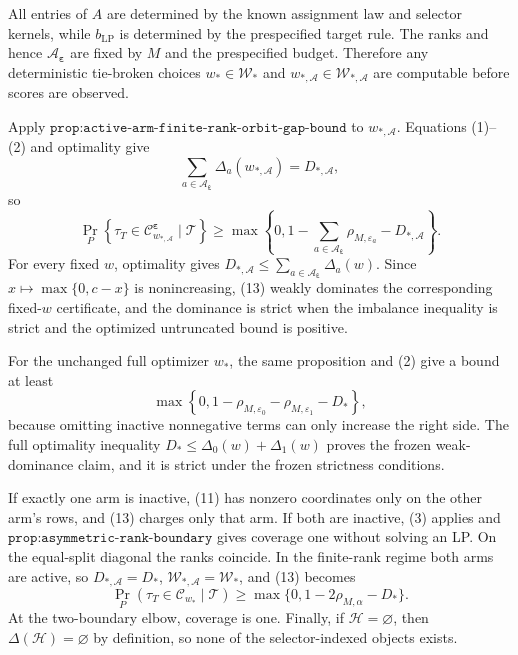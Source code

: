 All entries of \(A\) are determined by the known assignment law and selector kernels, while \(b_{\mathrm{LP}}\) is determined by the prespecified target rule. The ranks and hence \(\mathcal A_{\boldsymbol\varepsilon}\) are fixed by \(M\) and the prespecified budget. Therefore any deterministic tie-broken choices \(w_*\in\mathcal W_*\) and \(w_{*,\mathcal A}\in\mathcal W_{*,\mathcal A}\) are computable before scores are observed.

Apply \(\texttt{prop:active-arm-finite-rank-orbit-gap-bound}\) to \(w_{*,\mathcal A}\). Equations (1)--(2) and optimality give
\[
\sum_{a\in\mathcal A_{\boldsymbol\varepsilon}}\Delta_a(w_{*,\mathcal A})=D_{*,\mathcal A},
\]
so
\[
\Pr_P\!\left\{\tau_T\in\mathcal C^{\boldsymbol\varepsilon}_{w_{*,\mathcal A}}\mid\mathcal T\right\}
\ge\max\!\left\{0,1-\sum_{a\in\mathcal A_{\boldsymbol\varepsilon}}\rho_{M,\varepsilon_a}-D_{*,\mathcal A}\right\}.
\tag{13}
\]
For every fixed \(w\), optimality gives \(D_{*,\mathcal A}\le\sum_{a\in\mathcal A_{\boldsymbol\varepsilon}}\Delta_a(w)\). Since \(x\mapsto\max\{0,c-x\}\) is nonincreasing, (13) weakly dominates the corresponding fixed-\(w\) certificate, and the dominance is strict when the imbalance inequality is strict and the optimized untruncated bound is positive.

For the unchanged full optimizer \(w_*\), the same proposition and (2) give a bound at least
\[
\max\!\left\{0,1-\rho_{M,\varepsilon_0}-\rho_{M,\varepsilon_1}-D_*\right\},
\tag{14}
\]
because omitting inactive nonnegative terms can only increase the right side. The full optimality inequality \(D_*\le\Delta_0(w)+\Delta_1(w)\) proves the frozen weak-dominance claim, and it is strict under the frozen strictness conditions.

If exactly one arm is inactive, (11) has nonzero coordinates only on the other arm's rows, and (13) charges only that arm. If both are inactive, (3) applies and \(\texttt{prop:asymmetric-rank-boundary}\) gives coverage one without solving an LP. On the equal-split diagonal the ranks coincide. In the finite-rank regime both arms are active, so \(D_{*,\mathcal A}=D_*\), \(\mathcal W_{*,\mathcal A}=\mathcal W_*\), and (13) becomes
\[
\Pr_P(\tau_T\in\mathcal C_{w_*}\mid\mathcal T)\ge\max\{0,1-2\rho_{M,\alpha}-D_*\}.
\]
At the two-boundary elbow, coverage is one. Finally, if \(\mathcal H=\varnothing\), then \(\Delta(\mathcal H)=\varnothing\) by definition, so none of the selector-indexed objects exists.